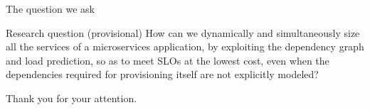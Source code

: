 \documentclass[10pt]{beamer}
\begin{document}
\begin{frame}{The question we ask}
  \begin{block}{Research question (provisional)}
    How can we dynamically and simultaneously size all the services of a microservices application, by exploiting the dependency graph and load prediction, so as to meet SLOs at the lowest cost, even when the dependencies required for provisioning itself are not explicitly modeled?
  \end{block}

\end{frame}

\begin{frame}
  \begin{center}
    \Large
    Thank you for your attention.
  \end{center}
\end{frame}
\end{document}
